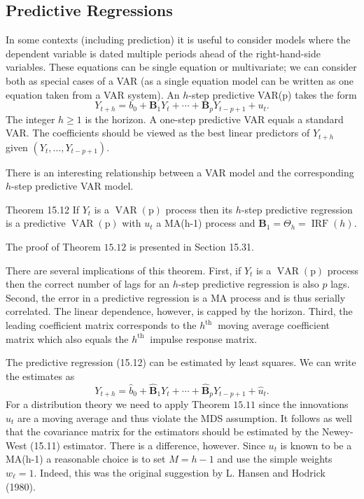 \documentclass[10pt]{article}
\begin{document}
\subsection{Predictive Regressions}
In some contexts (including prediction) it is useful to consider models where the dependent variable is dated multiple periods ahead of the right-hand-side variables. These equations can be single equation or multivariate; we can consider both as special cases of a VAR (as a single equation model can be written as one equation taken from a VAR system). An $h$-step predictive VAR(p) takes the form
$$
Y_{t+h}=b_{0}+\boldsymbol{B}_{1} Y_{t}+\cdots+\boldsymbol{B}_{p} Y_{t-p+1}+u_{t} .
$$
The integer $h \geq 1$ is the horizon. A one-step predictive VAR equals a standard VAR. The coefficients should be viewed as the best linear predictors of $Y_{t+h}$ given $\left(Y_{t}, \ldots, Y_{t-p+1}\right)$.

There is an interesting relationship between a VAR model and the corresponding $h$-step predictive VAR model.

Theorem 15.12 If $Y_{t}$ is a $\operatorname{VAR}(\mathrm{p})$ process then its $h$-step predictive regression is a predictive $\operatorname{VAR}(\mathrm{p})$ with $u_{t}$ a MA(h-1) process and $\boldsymbol{B}_{1}=\Theta_{h}=\operatorname{IRF}(h)$.

The proof of Theorem $15.12$ is presented in Section 15.31.

There are several implications of this theorem. First, if $Y_{t}$ is a $\operatorname{VAR}(\mathrm{p})$ process then the correct number of lags for an $h$-step predictive regression is also $p$ lags. Second, the error in a predictive regression is a MA process and is thus serially correlated. The linear dependence, however, is capped by the horizon. Third, the leading coefficient matrix corresponds to the $h^{\text {th }}$ moving average coefficient matrix which also equals the $h^{\text {th }}$ impulse response matrix.

The predictive regression (15.12) can be estimated by least squares. We can write the estimates as
$$
Y_{t+h}=\widehat{b}_{0}+\widehat{\boldsymbol{B}}_{1} Y_{t}+\cdots+\widehat{\boldsymbol{B}}_{p} Y_{t-p+1}+\widehat{u}_{t} .
$$
For a distribution theory we need to apply Theorem $15.11$ since the innovations $u_{t}$ are a moving average and thus violate the MDS assumption. It follows as well that the covariance matrix for the estimators should be estimated by the Newey-West (15.11) estimator. There is a difference, however. Since $u_{t}$ is known to be a MA(h-1) a reasonable choice is to set $M=h-1$ and use the simple weights $w_{\ell}=1$. Indeed, this was the original suggestion by L. Hansen and Hodrick (1980).
\end{document}
